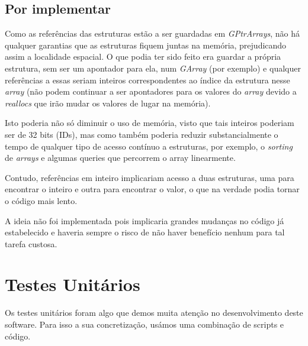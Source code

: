 \documentclass{article}
\begin{document}
        \subsection{Por implementar}
            Como as referências das estruturas estão a ser guardadas em \textit{GPtrArrays}, não há qualquer
            garantias que as estruturas fiquem juntas na memória, prejudicando assim
            a localidade espacial. O que podia ter sido feito era guardar a própria
            estrutura, sem ser um apontador para ela, num \textit{GArray} (por exemplo)
            e qualquer referências a essas seriam inteiros correspondentes ao índice
            da estrutura nesse \textit{array} (não podem continuar a ser apontadores para os valores
            do \textit{array} devido a \textit{reallocs} que irão mudar os valores de lugar na memória).
            
            Isto poderia não só diminuir o uso de memória, visto que tais 
            inteiros poderiam ser de 32 bits (IDs), mas como também poderia reduzir
            substancialmente o tempo de qualquer tipo de acesso contínuo a estruturas,
            por exemplo, o \textit{sorting} de \textit{arrays} e algumas queries
            que percorrem o array linearmente. 
            
            Contudo, referências em inteiro implicariam acesso a duas estruturas,
            uma para encontrar o inteiro e outra para encontrar o valor, o que na verdade
            podia tornar o código mais lento.

            A ideia não foi implementada pois implicaria grandes mudanças no código já estabelecido
            e haveria sempre o risco de não haver benefício nenhum para tal tarefa custosa.
            
    \section{Testes Unitários}
        Os testes unitários foram algo que demos muita atenção no desenvolvimento deste software.
        Para isso a sua concretização, usámos uma combinação de scripts e código.
        
\end{document}
